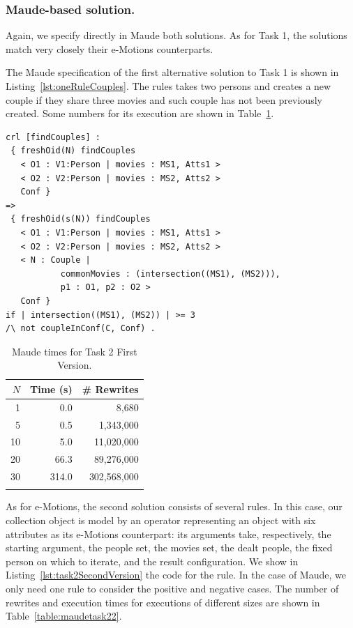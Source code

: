 \subsubsection{Maude-based solution.}

Again, we specify directly in Maude both solutions. As for Task 1, the solutions match very closely their e-Motions counterparts. 

The Maude specification of the first alternative solution to Task 1 is shown in Listing~\ref{lst:oneRuleCouples}. The rules takes two persons and creates a new couple if they share three movies and such couple has not been previously created. Some numbers for its execution are shown in Table~\ref{table:maudetask21}.
 
\begin{lstlisting}[caption=\code{createCouples} Maude rule., label=lst:oneRuleCouples]
crl [findCouples] :
 { freshOid(N) findCouples
   < O1 : V1:Person | movies : MS1, Atts1 >
   < O2 : V2:Person | movies : MS2, Atts2 > 
   Conf }
=>
 { freshOid(s(N)) findCouples
   < O1 : V1:Person | movies : MS1, Atts1 >
   < O2 : V2:Person | movies : MS2, Atts2 >
   < N : Couple | 
           commonMovies : (intersection((MS1), (MS2))),
           p1 : O1, p2 : O2 > 
   Conf }
if | intersection((MS1), (MS2)) | >= 3
/\ not coupleInConf(C, Conf) .
\end{lstlisting}

\begin{table}[htb]
\renewcommand{\tabcolsep}{6pt}
\renewcommand{\arraystretch}{1.2}
    \centering
	\begin{tabular}{r r r}
	$N$ & Time (s) & \# Rewrites \\
	\hline
	1 & 0.0 & 8,680 \\
	5 & 0.5 & 1,343,000 \\
	10 & 5.0 & 11,020,000 \\
	20 & 66.3 & 89,276,000 \\
	30 & 314.0 & 302,568,000 \\
	\hline \\
	\end{tabular}
	\caption{Maude times for Task 2 First Version.}\label{table:maudetask21}
\end{table}

As for e-Motions, the second solution consists of several rules. In this case, our collection object is model by an operator \code{<\{\_\}\{\_\}\{\_\}\{\_\}\{\_\}\{\_\}>} representing an object with six attributes as its e-Motions counterpart: its arguments take, respectively, the starting argument, the people set, the movies set, the dealt people, the fixed person on which to iterate, and the result configuration. We show in Listing~\ref{lst:task2SecondVersion} the code for the  rule. In the case of Maude, we only need one rule to consider the positive and negative cases. The number of rewrites and execution times for executions of different sizes are shown in Table~\ref{table:maudetask22}.

